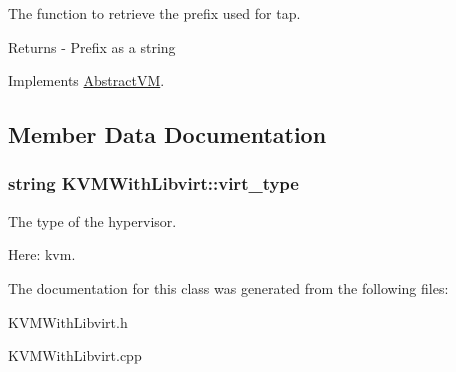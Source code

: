\-The function to retrieve the prefix used for tap. 

\begin{DoxyReturn}{\-Returns}
-\/ \-Prefix as a string 
\end{DoxyReturn}


\-Implements \hyperlink{classAbstractVM_ae2fa8799756c7ca16b29bfccd9051a1f}{\-Abstract\-V\-M}.



\subsection{\-Member \-Data \-Documentation}
\hypertarget{classKVMWithLibvirt_a6f19aaec56c4a4e486dfdd8538e37b3a}{
\subsubsection[{virt\-\_\-type}]{\setlength{\rightskip}{0pt plus 5cm}string {\bf \-K\-V\-M\-With\-Libvirt\-::virt\-\_\-type}}}\label{classKVMWithLibvirt_a6f19aaec56c4a4e486dfdd8538e37b3a}


\-The type of the hypervisor. 

\-Here\-: kvm. 

\-The documentation for this class was generated from the following files\-:\begin{DoxyCompactItemize}
\item 
\-K\-V\-M\-With\-Libvirt.\-h\item 
\-K\-V\-M\-With\-Libvirt.\-cpp\end{DoxyCompactItemize}
